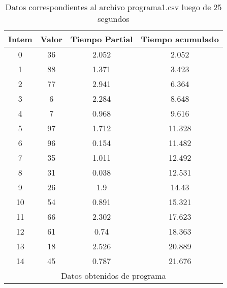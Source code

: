 \begin{table}[ht!]
\center

\caption{Datos correspondientes al archivo programa1.csv luego de 25 segundos}
\label{tab:programa1}
\begin{tabular}{|c|c|c|c|}
\toprule
Intem & Valor & Tiempo Partial & Tiempo acumulado \\
\midrule
0 & 36 & 2.052 & 2.052 \\
1 & 88 & 1.371 & 3.423 \\
2 & 77 & 2.941 & 6.364 \\
3 & 6 & 2.284 & 8.648 \\
4 & 7 & 0.968 & 9.616 \\
5 & 97 & 1.712 & 11.328 \\
6 & 96 & 0.154 & 11.482 \\
7 & 35 & 1.011 & 12.492 \\
8 & 31 & 0.038 & 12.531 \\
9 & 26 & 1.9 & 14.43 \\
10 & 54 & 0.891 & 15.321 \\
11 & 66 & 2.302 & 17.623 \\
12 & 61 & 0.74 & 18.363 \\
13 & 18 & 2.526 & 20.889 \\
14 & 45 & 0.787 & 21.676 \\
\hline \multicolumn{4}{|c|}{Datos obtenidos de programa} \\


\bottomrule
\end{tabular}
\end{table}
